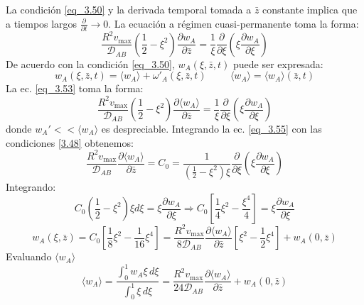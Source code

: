 \noindent La condición \eqref{eq_3.50} y la derivada temporal tomada a $\bar{z}$ constante implica que a tiempos largos $\frac{\partial}{\partial t}\to 0$. La ecuación a régimen cuasi-permanente toma la forma:
\begin{equation}
\frac{R^2 v_{\mathrm{max}}}{\mathscr{D}_{AB}}\left( \frac{1}{2} - \xi^2 \right)\frac{\partial w_A}{\partial \bar{z}}=\frac{1}{\xi} \frac{\partial}{\partial \xi}\left( \xi \frac{\partial w_A}{\partial \xi} \right)
\label{eq_3.53}
\end{equation}
De acuerdo con la condición \eqref{eq_3.50}, $w_A(\xi, \bar{z},t)$ puede ser expresada:
\begin{equation}
w_A(\xi, \bar{z}, t) = \langle w_A \rangle + \omega'_A(\xi,\bar{z}, t) \hspace{1cm} \langle w_A\rangle=\langle w_A\rangle (\bar{z},t)
\end{equation}
La ec. \eqref{eq_3.53} toma la forma:
\begin{equation}
\frac{R^2 v_{\mathrm{max}}}{\mathscr{D}_{AB}}\left( \frac{1}{2} - \xi^2 \right)\frac{\partial \langle w_A\rangle}{\partial \bar{z}}=\frac{1}{\xi} \frac{\partial}{\partial \xi}\left( \xi \frac{\partial w_A}{\partial \xi} \right)
\label{eq_3.55}
\end{equation}
donde $w_A'<<\langle w_A\rangle$ es despreciable. Integrando la ec. \eqref{eq_3.55} con las condiciones \eqref{3.48} obtenemos:
\begin{equation*}
\frac{R^2 v_{\mathrm{max}}}{\mathscr{D}_{AB}}\frac{\partial \langle w_A\rangle}{\partial \bar{z}}=C_0=\frac{1}{\left( \frac{1}{2} - \xi^2 \right)\xi} \frac{\partial}{\partial \xi}\left( \xi \frac{\partial w_A}{\partial \xi} \right)
\end{equation*}
Integrando:
\[
C_0\left(\frac{1}{2}-\xi^2\right)\xi d\xi=\xi\frac{\partial w_A}{\partial \xi}\Rightarrow C_0\left[\frac{1}{4}\xi^2-\frac{\xi^4}{4}\right]=\xi\frac{\partial w_A}{\partial\xi}
\]
\begin{equation}
w_A(\xi, \bar{z}) = C_0\left[\frac{1}{8}\xi^2-\frac{1}{16}\xi^4\right]=\frac{R^2 v_{\mathrm{max}}}{8 \mathscr{D}_{AB}}\frac{\partial \langle w_A \rangle}{\partial \bar{z}}\left[ \xi^2 - \frac{1}{2} \xi^4 \right]+ w_A(0, \bar{z})
\label{eq_3.56}
\end{equation}
Evaluando $\langle w_A\rangle$
\begin{equation}
\langle w_A \rangle= \frac{\displaystyle \int_0^1 w_A \xi \, d\xi}{\displaystyle \int_0^1 \xi \, d\xi}= \frac{R^2 v_{\mathrm{max}}}{24 \mathscr{D}_{AB}}\frac{\partial \langle w_A \rangle}{\partial \bar{z}}+ w_A(0, \bar{z})
\label{eq_3.57}
\end{equation}
